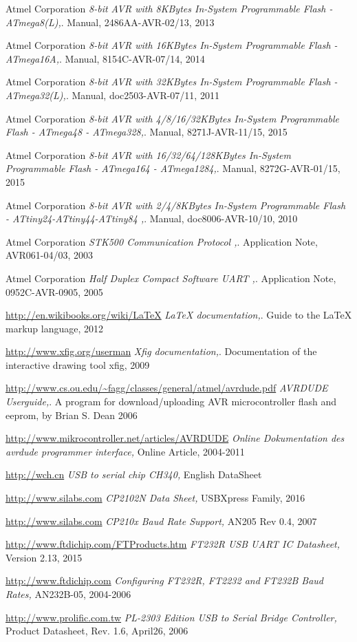 \documentclass[pdftex,12pt,a4paper,oneside,english]{report}
\begin{document}
\begin{thebibliography}{99}

Atmel Corporation
\emph{8-bit AVR with 8KBytes In-System Programmable Flash - ATmega8(L),}.
Manual,
2486AA-AVR-02/13,
2013

Atmel Corporation
\emph{8-bit AVR with 16KBytes In-System Programmable Flash - ATmega16A,}.
Manual,
8154C-AVR-07/14,
2014

Atmel Corporation
\emph{8-bit AVR with 32KBytes In-System Programmable Flash - ATmega32(L),}.
Manual,
doc2503-AVR-07/11,
2011

Atmel Corporation
\emph{8-bit AVR with 4/8/16/32KBytes In-System Programmable Flash - ATmega48 - ATmega328,}.
Manual,
8271J-AVR-11/15,
2015

Atmel Corporation
\emph{8-bit AVR with 16/32/64/128KBytes In-System Programmable Flash - ATmega164 - ATmega1284,}.
Manual,
8272G-AVR-01/15,
2015

Atmel Corporation
\emph{8-bit AVR with 2/4/8KBytes In-System Programmable Flash - ATtiny24-ATtiny44-ATtiny84 ,}.
Manual,
doc8006-AVR-10/10,
2010

Atmel Corporation
\emph{STK500 Communication Protocol ,}.
Application Note,
AVR061-04/03,
2003

Atmel Corporation
\emph{Half Duplex Compact Software UART ,}.
Application Note,
0952C-AVR-0905,
2005

\url{http://en.wikibooks.org/wiki/LaTeX}
\emph{LaTeX documentation,}.
Guide to the LaTeX markup language,
2012

\url{http://www.xfig.org/userman}
\emph{Xfig documentation,}.
Documentation of the interactive drawing tool xfig,
2009

\url{http://www.cs.ou.edu/~fagg/classes/general/atmel/avrdude.pdf}
\emph{AVRDUDE Userguide,}.
A program for download/uploading AVR microcontroller flash and eeprom,
by Brian S. Dean
2006

\url{http://www.mikrocontroller.net/articles/AVRDUDE}
\emph{Online Dokumentation des avrdude programmer interface,}
Online Article,
2004-2011

\url{http://wch.cn}
\emph{USB to serial chip CH340,}
English DataSheet

\url{http://www.silabs.com}
\emph{CP2102N Data Sheet,}
USBXpress Family,
2016

\url{http://www.silabs.com}
\emph{CP210x Baud Rate Support,}
AN205 Rev 0.4,
2007

\url{http://www.ftdichip.com/FTProducts.htm}
\emph{FT232R USB UART IC Datasheet,}
Version 2.13,
2015

\url{http://www.ftdichip.com}
\emph{Configuring FT232R, FT2232 and FT232B Baud Rates,}
AN232B-05,
2004-2006

\url{http://www.prolific.com.tw}
\emph{PL-2303 Edition USB to Serial Bridge Controller,}
Product Datasheet, Rev. 1.6,
April26, 2006

\end{thebibliography}
\end{document}
